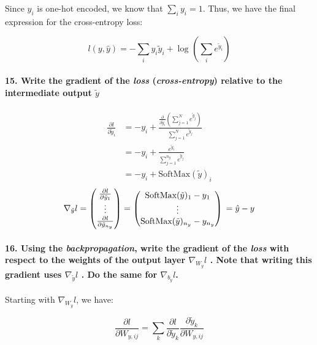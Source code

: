 Since $y_i$ is one-hot encoded, we know that $\sum_i y_i = 1$. Thus, we have the final expression for the cross-entropy loss:

\[ l(y, \hat{y}) = - \sum_{i}^{} y_i \tilde{y}_i + \log_{} \left(\sum_{i}^{} e^{\tilde{y}_i}\right) \]

\paragraph{15. Write the gradient of the \textit{loss} (\textit{cross-entropy}) relative to the intermediate output $ \tilde{y} $ }
\begin{align*}
    \frac{\partial l}{\partial \tilde{y}_i} & = -y_i + \frac{\frac{\partial }{\partial \tilde{y}_i } (\sum_{j=1}^{N} e^{ \tilde{y}_j })}{\sum_{j=1}^{N} e^{ \tilde{y}_j }} \\
                                            & = - y_i + \frac{e^{\tilde{y}_i}}{\sum_{j=1}^{n_y} e^{ \tilde{y}_j}}                                                          \\
                                            & = - y_i + \text{SoftMax}(\tilde{y})_i
\end{align*}
\[
    \nabla _{\tilde{y}}l = \begin{pmatrix}
        \frac{\partial l}{\partial \tilde{y}_1} \\
        \vdots                                  \\
        \frac{\partial l}{\partial \tilde{y}_{n_y}}
    \end{pmatrix} = \begin{pmatrix}
        \text{SoftMax}(\tilde{y})_1 - y_1 \\
        \vdots                            \\
        \text{SoftMax}(\tilde{y})_{n_y} - y_{n_y}
    \end{pmatrix} \\
    = \hat{y} - y
\]

\paragraph{16. Using the \textit{backpropagation}, write the gradient of the \textit{loss} with respect to the weights of the output layer $ \nabla _{W_y}l $ . Note that writing this gradient uses $ \nabla _{\tilde{y}}l $ . Do the same for $ \nabla _{b_y}l $.}

Starting with \( \nabla _{W_y} l \), we have:

\[
    \frac{\partial l}{\partial W_{y,ij}} = \sum_{k}^{} \frac{\partial l}{\partial \tilde{y}_k} \frac{\partial \tilde{y}_k}{\partial W_{y,ij}}
\]

